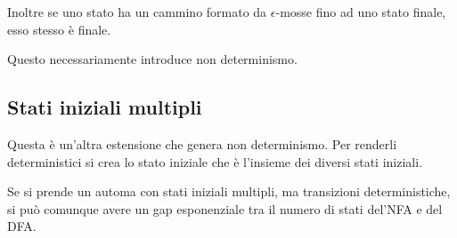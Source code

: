 \documentclass[12pt]{article}
\begin{document}
Inoltre se uno stato ha un cammino formato da $\epsilon$-mosse fino ad uno stato finale, esso stesso è finale.

Questo necessariamente introduce non determinismo.

\subsection{Stati iniziali multipli}
Questa è un'altra estensione che genera non determinismo.
Per renderli deterministici si crea lo stato iniziale che è l'insieme dei diversi stati iniziali.

Se si prende un automa con stati iniziali multipli, ma transizioni deterministiche, si può comunque avere un gap esponenziale tra il numero di stati del'NFA e del DFA.
\end{document}
